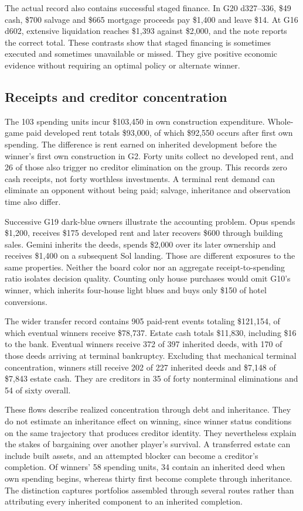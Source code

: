 \documentclass[11pt,letterpaper]{article}
\begin{document}
The actual record also contains successful staged finance. In G20 d327--336, \$49 cash, \$700 salvage and \$665 mortgage proceeds pay \$1,400 and leave \$14. At G16 d602, extensive liquidation reaches \$1,393 against \$2,000, and the note reports the correct total. These contrasts show that staged financing is sometimes executed and sometimes unavailable or missed. They give positive economic evidence without requiring an optimal policy or alternate winner.

\subsection{Receipts and creditor concentration}

The 103 spending units incur \$103,450 in own construction expenditure. Whole-game paid developed rent totals \$93,000, of which \$92,550 occurs after first own spending. The difference is rent earned on inherited development before the winner's first own construction in G2. Forty units collect no developed rent, and 26 of those also trigger no creditor elimination on the group. This records zero cash receipts, not forty worthless investments. A terminal rent demand can eliminate an opponent without being paid; salvage, inheritance and observation time also differ.

Successive G19 dark-blue owners illustrate the accounting problem. Opus spends \$1,200, receives \$175 developed rent and later recovers \$600 through building sales. Gemini inherits the deeds, spends \$2,000 over its later ownership and receives \$1,400 on a subsequent Sol landing. Those are different exposures to the same properties. Neither the board color nor an aggregate receipt-to-spending ratio isolates decision quality. Counting only house purchases would omit G10's winner, which inherits four-house light blues and buys only \$150 of hotel conversions.

The wider transfer record contains 905 paid-rent events totaling \$121,154, of which eventual winners receive \$78,737. Estate cash totals \$11,830, including \$16 to the bank. Eventual winners receive 372 of 397 inherited deeds, with 170 of those deeds arriving at terminal bankruptcy. Excluding that mechanical terminal concentration, winners still receive 202 of 227 inherited deeds and \$7,148 of \$7,843 estate cash. They are creditors in 35 of forty nonterminal eliminations and 54 of sixty overall.

These flows describe realized concentration through debt and inheritance. They do not estimate an inheritance effect on winning, since winner status conditions on the same trajectory that produces creditor identity. They nevertheless explain the stakes of bargaining over another player's survival. A transferred estate can include built assets, and an attempted blocker can become a creditor's completion. Of winners' 58 spending units, 34 contain an inherited deed when own spending begins, whereas thirty first become complete through inheritance. The distinction captures portfolios assembled through several routes rather than attributing every inherited component to an inherited completion.



\begingroup\small


\endgroup
\clearpage\appendix

\end{document}
